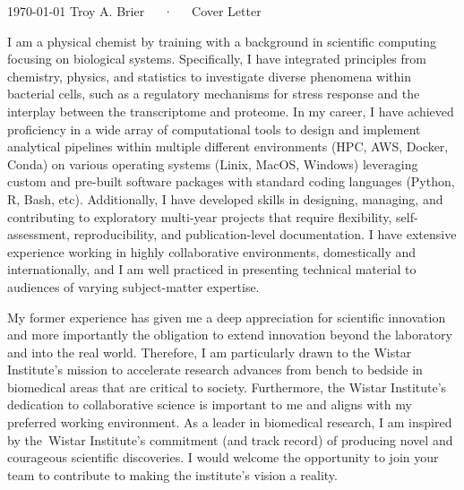 \documentclass[11pt, a4paper]{awesome-cv}
\newcommand{\companyname}{Wistar Institute}
\begin{document}
	
	\makecvheader[R]
	
	\makecvfooter
	{\today}
	{Troy A. Brier~~~·~~~Cover Letter}
	{}
	
	\makelettertitle
	
	\begin{cvletter}
		I am a physical chemist by training with a background in scientific computing focusing on biological systems.
		Specifically, I have integrated principles from chemistry, physics, and statistics to investigate diverse phenomena within bacterial cells, such as a regulatory mechanisms for stress response and the interplay between the transcriptome and proteome.	
		In my career, I have achieved proficiency in a wide array of computational tools to design and implement analytical pipelines within multiple different environments (HPC, AWS, Docker, Conda) on various operating systems (Linix, MacOS, Windows) leveraging custom and pre-built software packages with standard coding languages (Python, R, Bash, etc).
		Additionally, I have developed skills in designing, managing, and contributing to exploratory multi-year projects that require flexibility, self-assessment, reproducibility, and publication-level documentation.
		I have extensive experience working in highly collaborative environments, domestically and internationally, and I am well practiced in presenting technical material to audiences of varying subject-matter expertise.
				
		\lettersection{Why the \companyname?}
		My former experience has given me a deep appreciation for scientific innovation and more importantly the obligation to extend  innovation beyond the laboratory and into the real world. 	
		Therefore, I am particularly drawn to the \companyname's mission to accelerate research advances from bench to bedside in biomedical areas that are critical to society.
		Furthermore, the \companyname's dedication to collaborative science is important to me and aligns with my preferred working environment. 
		As a leader in biomedical research, I am inspired by the~\companyname's commitment (and track record) of producing novel and courageous scientific discoveries.  
		I would welcome the opportunity to join your team to contribute to making the institute's vision a reality.
		

\end{cvletter}
\end{document}
